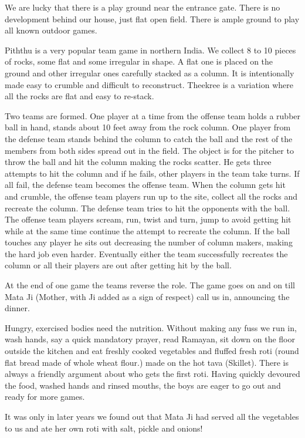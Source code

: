 We are lucky that there is a play ground near the entrance gate. There is
no development behind our house, just flat open field. There is ample
ground to play all known outdoor games. 

Piththu is a very popular team game in northern India. We collect 8 to 10
pieces of rocks, some flat and some irregular in shape. A flat one is
placed on the ground and other irregular ones carefully stacked as
a column. It is intentionally made easy to crumble and difficult to
reconstruct. Theekree is a variation where all the rocks are flat and easy
to re-stack.

Two teams are formed. One player at a time from the offense team holds
a rubber ball in hand, stands about 10 feet away from the rock column.
One player from the defense team stands behind the column to catch the
ball and the rest of the members from both sides spread out in the field.
The object is for the pitcher to throw the ball and hit the column making
the rocks scatter. He gets three attempts to hit the column and if he
fails, other players in the team take turns. If all fail, the defense team
becomes the offense team. When the column gets hit and crumble, the
offense team players run up to the site, collect all the rocks and
recreate the column. The defense team tries to hit the opponents with the
ball. The offense team players scream, run, twist and turn, jump to avoid
getting hit while at the same time continue the attempt to recreate the
column. If the ball touches any player he sits out decreasing the number
of column makers, making the hard job even harder. Eventually either the
team successfully recreates the column or all their players are out after
getting hit by the ball. 

At the end of one game the teams reverse the role. The game goes on and on
till Mata Ji (Mother, with Ji added as a sign of respect) call us in,
announcing the dinner. 

Hungry, exercised bodies need the nutrition. Without making any fuss we
run in, wash hands, say a quick mandatory prayer, read Ramayan, sit down
on the floor outside the kitchen and eat freshly cooked vegetables and
fluffed fresh roti (round flat bread made of whole wheat flour.) made on
the hot tava (Skillet). There is always a friendly argument about who gets
the first roti. Having quickly devoured the food, washed hands and rinsed
mouths, the boys are eager to go out and ready for more games. 

It was only in later years we found out that Mata Ji had served all the
vegetables to us and ate her own roti with salt, pickle and onions!

